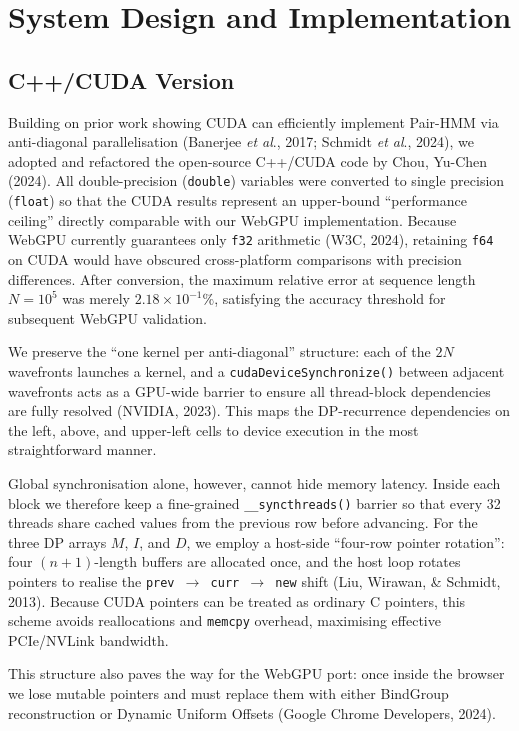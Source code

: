 \documentclass[PhD]{PHlab-thesis}
\begin{document}
\section{System Design and Implementation}

\subsection{C++/CUDA Version}
Building on prior work showing CUDA can efficiently implement Pair-HMM via anti-diagonal parallelisation (Banerjee \emph{et al}., 2017; Schmidt \emph{et al}., 2024), we adopted and refactored the open-source C++/CUDA code by Chou, Yu-Chen (2024). All double-precision (\texttt{double}) variables were converted to single precision (\texttt{float}) so that the CUDA results represent an upper-bound “performance ceiling” directly comparable with our WebGPU implementation. Because WebGPU currently guarantees only \texttt{f32} arithmetic (W3C, 2024), retaining \texttt{f64} on CUDA would have obscured cross-platform comparisons with precision differences. After conversion, the maximum relative error at sequence length $N = 10^{5}$ was merely $2.18 \times 10^{-1}\%$, satisfying the accuracy threshold for subsequent WebGPU validation.

We preserve the “one kernel per anti-diagonal” structure: each of the $2N$ wavefronts launches a kernel, and a \texttt{cudaDeviceSynchronize()} between adjacent wavefronts acts as a GPU-wide barrier to ensure all thread-block dependencies are fully resolved (NVIDIA, 2023). This maps the DP-recurrence dependencies on the left, above, and upper-left cells to device execution in the most straightforward manner.

Global synchronisation alone, however, cannot hide memory latency. Inside each block we therefore keep a fine-grained \texttt{\_\_syncthreads()} barrier so that every 32 threads share cached values from the previous row before advancing. For the three DP arrays $M$, $I$, and $D$, we employ a host-side “four-row pointer rotation”: four $(n\!+\!1)$-length buffers are allocated once, and the host loop rotates pointers to realise the \texttt{prev $\rightarrow$ curr $\rightarrow$ new} shift (Liu, Wirawan, \& Schmidt, 2013). Because CUDA pointers can be treated as ordinary C pointers, this scheme avoids reallocations and \texttt{memcpy} overhead, maximising effective PCIe/NVLink bandwidth.

This structure also paves the way for the WebGPU port: once inside the browser we lose mutable pointers and must replace them with either BindGroup reconstruction or Dynamic Uniform Offsets (Google Chrome Developers, 2024).
\end{document}
